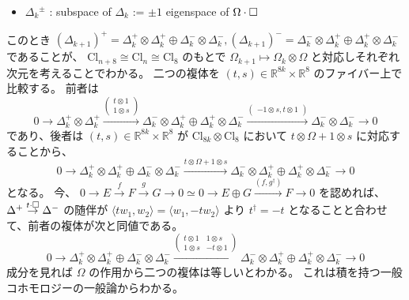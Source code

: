 \documentclass[dvipdfmx]{jsarticle}
\begin{document}
\begin{Proof}
\begin{itemize}
    \item \({\Delta_{k}}^{\pm}\) : subspace of \(\Delta_{k}\) := \(\pm 1\) eigenspace of \(\Omega \cdot \square\)
  \end{itemize}
  このとき \((\Delta_{k+1})^{+} = \Delta_{k}^{+} \otimes \Delta_{k}^{+} \oplus \Delta_{k}^{-} \otimes \Delta_{k}^{-}, (\Delta_{k+1})^{-} = \Delta_{k}^{-} \otimes \Delta_{k}^{+} \oplus \Delta_{k}^{+} \otimes \Delta_{k}^{-}\) であることが、 \(\text{Cl}_{n+8} \cong \text{Cl}_{n} \cong \text{Cl}_{8}\) のもとで \(\Omega_{k+1} \mapsto \Omega_{k} \otimes \Omega\) と対応しそれぞれ次元を考えることでわかる。
  二つの複体を \((t,s) \in \mathbb{R}^{8k} \times \mathbb{R}^{8}\) のファイバー上で比較する。
  前者は
  \[
    0 \to
    \Delta_{k}^{+} \otimes \Delta_{k}^{+}
    \overset{\begin{pmatrix} t \otimes 1 \\ 1 \otimes s \end{pmatrix}}{\to}
    \Delta_{k}^{-} \otimes \Delta_{k}^{+} \oplus \Delta_{k}^{+} \otimes \Delta_{k}^{-}
    \overset{\begin{pmatrix} -1 \otimes s, t \otimes 1 \end{pmatrix}}{\to}
    \Delta_{k}^{-} \otimes \Delta_{k}^{-}
    \to 0
  \]
  であり、後者は \((t,s) \in \mathbb{R}^{8k} \times \mathbb{R}^8\) が \(\text{Cl}_{8k} \otimes \text{Cl}_{8}\) において \(t \otimes \Omega + 1 \otimes s\) に対応することから、
  \[
    0 \to
    \Delta_{k}^{+} \otimes \Delta_{k}^{+} \oplus \Delta_{k}^{-} \otimes \Delta_{k}^{-}
    \overset{t \otimes \Omega + 1 \otimes s}{\to}
    \Delta_{k}^{-} \otimes \Delta_{k}^{+} \oplus \Delta_{k}^{+} \otimes \Delta_{k}^{-}
    \to 0
  \]
  となる。
  今、 \(0 \to E \overset{f}{\to} F \overset{g}{\to} G \to 0 \simeq 0 \to E \oplus G \overset{(f,g^{\dagger})}{\to} F \to 0\) を認めれば、 \(\Delta^{+} \overset{t \cdot \square}{\to} \Delta^{-}\) の随伴が \(\langle t w_1 , w_2 \rangle = \langle w_1 , -t w_2 \rangle\) より \(t^{\dagger} = -t\) となることと合わせて、前者の複体が次と同値である。
  \[
    0 \to
    \Delta_{k}^{+} \otimes \Delta_{k}^{+} \oplus \Delta_{k}^{-} \otimes \Delta_{k}^{-}
    \overset{\begin{pmatrix} t \otimes 1 & 1 \otimes s \\ 1 \otimes s & - t \otimes 1 \end{pmatrix}}{\to}
    \Delta_{k}^{-} \otimes \Delta_{k}^{+} \oplus \Delta_{k}^{+} \otimes \Delta_{k}^{-}
    \to 0
  \]
  成分を見れば \(\Omega\) の作用から二つの複体は等しいとわかる。
\itemprof
  これは積を持つ一般コホモロジーの一般論からわかる。
\end{Proof}
\end{document}
